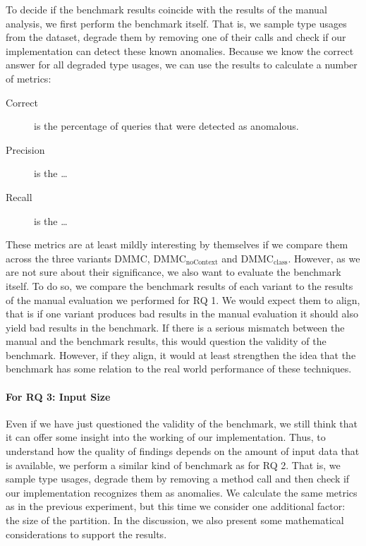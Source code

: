 To decide if the benchmark results coincide with the results of the manual analysis, we first perform the benchmark itself.
That is, we sample type usages from the dataset, degrade them by removing one of their calls and check if our implementation can detect these known anomalies.
Because we know the correct answer for all degraded type usages, we can use the results to calculate a number of metrics:
\begin{description}
    \item [Correct] is the percentage of queries that were detected as anomalous.
    \item [Precision] is the \ldots
    \item [Recall] is the \ldots
\end{description}
These metrics are at least mildly interesting by themselves if we compare them across the three variants $\text{DMMC}$, $\text{DMMC}_\text{noContext}$ and $\text{DMMC}_\text{class}$.
However, as we are not sure about their significance, we also want to evaluate the benchmark itself.
To do so, we compare the benchmark results of each variant to the results of the manual evaluation we performed for RQ 1.
We would expect them to align, that is if one variant produces bad results in the manual evaluation it should also yield bad results in the benchmark.
If there is a serious mismatch between the manual and the benchmark results, this would question the validity of the benchmark.
However, if they align, it would at least strengthen the idea that the benchmark has some relation to the real world performance of these techniques.


\paragraph{For RQ 3: Input Size}

Even if we have just questioned the validity of the benchmark, we still think that it can offer some insight into the working of our implementation.
Thus, to understand how the quality of findings depends on the amount of input data that is available, we perform a similar kind of benchmark as for RQ 2.
That is, we sample type usages, degrade them by removing a method call and then check if our implementation recognizes them as anomalies.
We calculate the same metrics as in the previous experiment, but this time we consider one additional factor: the size of the partition.
In the discussion, we also present some mathematical considerations to support the results.

